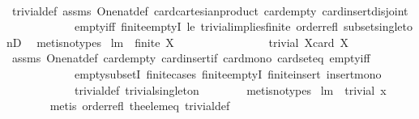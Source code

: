 \begin{isabellebody}
%
\isadelimproof
\ \ \ \ \ \ %
\endisadelimproof
%
\isatagproof
{}\isamarkupfalse%
\ trivial{\isacharunderscore}def\ assms\ One{\isacharunderscore}nat{\isacharunderscore}def\ card{\isacharunderscore}cartesian{\isacharunderscore}product\ card{\isacharunderscore}empty\ card{\isacharunderscore}insert{\isacharunderscore}disjoint\isanewline
\ \ \ \ \ \ \ \ \ \ \ \ empty{\isacharunderscore}iff\ finite{\isachardot}emptyI\ le{}\ trivial{\isacharunderscore}implies{\isacharunderscore}finite\ order{\isacharunderscore}refl\ subset{\isacharunderscore}singletonD\ \isamarkupfalse%
\ {\isacharparenleft}metis{\isacharparenleft}no{\isacharunderscore}types{\isacharparenright}{\isacharparenright}%
\endisatagproof
{\isafoldproof}%
%
\isadelimproof
\isanewline
%
\endisadelimproof
\isanewline
{}\isamarkupfalse%
\ lm{}{}{\isacharcolon}\ \ {\isachardoublequoteopen}finite\ X{\isachardoublequoteclose}\ \isanewline
\ \ \ \ \ \ \ \ \ \ \ \ \ \ \ {\isachardoublequoteopen}trivial\ X{\isacharequal}{\isacharparenleft}card\ X\ {\isasymle}\ {}{\isacharparenright}{\isachardoublequoteclose}\ \isanewline
%
\isadelimproof
\ \ \ \ \ \ %
\endisadelimproof
%
\isatagproof
{}\isamarkupfalse%
\ assms\ One{\isacharunderscore}nat{\isacharunderscore}def\ card{\isacharunderscore}empty\ card{\isacharunderscore}insert{\isacharunderscore}if\ card{\isacharunderscore}mono\ card{\isacharunderscore}seteq\ empty{\isacharunderscore}iff\ \isanewline
\ \ \ \ \ \ \ \ \ \ \ \ empty{\isacharunderscore}subsetI\ finite{\isachardot}cases\ finite{\isachardot}emptyI\ finite{\isacharunderscore}insert\ insert{\isacharunderscore}mono\ \isanewline
\ \ \ \ \ \ \ \ \ \ \ \ trivial{\isacharunderscore}def\ trivial{\isacharunderscore}singleton\isanewline
\ \ \ \ \ \ \isamarkupfalse%
\ {\isacharparenleft}metis{\isacharparenleft}no{\isacharunderscore}types{\isacharparenright}{\isacharparenright}%
\endisatagproof
{\isafoldproof}%
%
\isadelimproof
\isanewline
%
\endisadelimproof
\isanewline
{}\isamarkupfalse%
\ lm{}{}{\isacharcolon}\ \ {\isachardoublequoteopen}trivial\ {\isacharbraceleft}x{\isacharbraceright}{\isachardoublequoteclose}\ \isanewline
%
\isadelimproof
\ \ \ \ \ \ %
\endisadelimproof
%
\isatagproof
{}\isamarkupfalse%
\ {\isacharparenleft}metis\ order{\isacharunderscore}refl\ the{\isacharunderscore}elem{\isacharunderscore}eq\ trivial{\isacharunderscore}def{\isacharparenright}%
\endisatagproof

\end{isabellebody}
